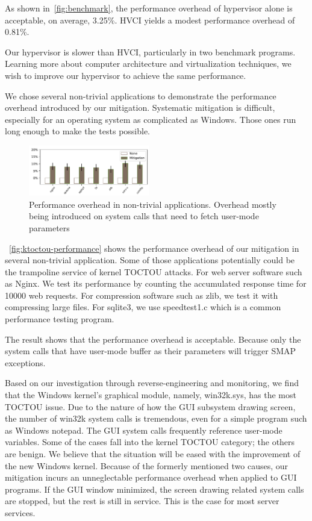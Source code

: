 As shown in~\autoref{fig:benchmark}, the performance overhead of hypervisor alone is acceptable, on average, 3.25\%. HVCI yields a modest performance overhead of 0.81\%.

Our hypervisor is slower than HVCI, particularly in two benchmark programs. Learning more about computer architecture and virtualization techniques, we wish to improve our hypervisor to achieve the same performance.

We chose several non-trivial applications to demonstrate the performance overhead introduced by our mitigation. Systematic mitigation is difficult, especially for an operating system as complicated as Windows. Those ones run long enough to make the tests possible.

\begin{figure}[th]
  \includegraphics[width=0.47\textwidth]{figures/performance4}
  \centering
  \caption{Performance overhead in non-trivial applications. Overhead mostly being introduced on system calls that need to fetch user-mode parameters}
  \label{fig:ktoctou-performance}
\end{figure}

~\autoref{fig:ktoctou-performance} shows the performance overhead of our mitigation in several non-trivial application. Some of those applications potentially could be the trampoline service of kernel TOCTOU attacks.
For web server software such as Nginx. We test its performance by counting the accumulated response time for 10000 web requests. For compression software such as zlib, we test it with compressing large files. For sqlite3, we use speedtest1.c which is a common performance testing program.

The result shows that the performance overhead is acceptable. Because only the system calls that have user-mode buffer as their parameters will trigger SMAP exceptions. 



Based on our investigation through reverse-engineering and monitoring, we find that the Windows kernel's graphical module, namely, win32k.sys, has the most TOCTOU issue. Due to the nature of how the GUI subsystem drawing screen, the number of win32k system calls is tremendous, even for a simple program such as Windows notepad. The GUI system calls frequently reference user-mode variables. Some of the cases fall into the kernel TOCTOU category; the others are benign. We believe that the situation will be eased with the improvement of the new Windows kernel. Because of the formerly mentioned two causes, our mitigation incurs an unneglectable performance overhead when applied to GUI programs. If the GUI window minimized, the screen drawing related system calls are stopped, but the rest is still in service. This is the case for most server services.


